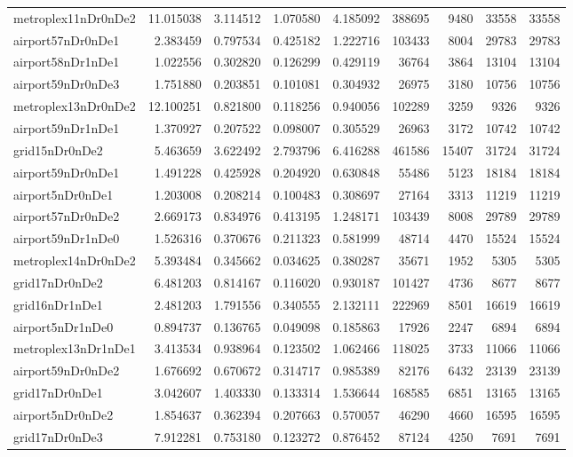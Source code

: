 \documentclass[../../../thesis.tex]{subfiles}
\begin{document}
\begin{longtable}{|l|r|r|r|r|r|r|r|r|}
metroplex11nDr0nDe2 & 11.015038 & 3.114512 & 1.070580 & 4.185092 & 388695 & 9480 & 33558 & 33558 \\
airport57nDr0nDe1 & 2.383459 & 0.797534 & 0.425182 & 1.222716 & 103433 & 8004 & 29783 & 29783 \\
airport58nDr1nDe1 & 1.022556 & 0.302820 & 0.126299 & 0.429119 & 36764 & 3864 & 13104 & 13104 \\
airport59nDr0nDe3 & 1.751880 & 0.203851 & 0.101081 & 0.304932 & 26975 & 3180 & 10756 & 10756 \\
metroplex13nDr0nDe2 & 12.100251 & 0.821800 & 0.118256 & 0.940056 & 102289 & 3259 & 9326 & 9326 \\
airport59nDr1nDe1 & 1.370927 & 0.207522 & 0.098007 & 0.305529 & 26963 & 3172 & 10742 & 10742 \\
grid15nDr0nDe2 & 5.463659 & 3.622492 & 2.793796 & 6.416288 & 461586 & 15407 & 31724 & 31724 \\
airport59nDr0nDe1 & 1.491228 & 0.425928 & 0.204920 & 0.630848 & 55486 & 5123 & 18184 & 18184 \\
airport5nDr0nDe1 & 1.203008 & 0.208214 & 0.100483 & 0.308697 & 27164 & 3313 & 11219 & 11219 \\
airport57nDr0nDe2 & 2.669173 & 0.834976 & 0.413195 & 1.248171 & 103439 & 8008 & 29789 & 29789 \\
airport59nDr1nDe0 & 1.526316 & 0.370676 & 0.211323 & 0.581999 & 48714 & 4470 & 15524 & 15524 \\
metroplex14nDr0nDe2 & 5.393484 & 0.345662 & 0.034625 & 0.380287 & 35671 & 1952 & 5305 & 5305 \\
grid17nDr0nDe2 & 6.481203 & 0.814167 & 0.116020 & 0.930187 & 101427 & 4736 & 8677 & 8677 \\
grid16nDr1nDe1 & 2.481203 & 1.791556 & 0.340555 & 2.132111 & 222969 & 8501 & 16619 & 16619 \\
airport5nDr1nDe0 & 0.894737 & 0.136765 & 0.049098 & 0.185863 & 17926 & 2247 & 6894 & 6894 \\
metroplex13nDr1nDe1 & 3.413534 & 0.938964 & 0.123502 & 1.062466 & 118025 & 3733 & 11066 & 11066 \\
airport59nDr0nDe2 & 1.676692 & 0.670672 & 0.314717 & 0.985389 & 82176 & 6432 & 23139 & 23139 \\
grid17nDr0nDe1 & 3.042607 & 1.403330 & 0.133314 & 1.536644 & 168585 & 6851 & 13165 & 13165 \\
airport5nDr0nDe2 & 1.854637 & 0.362394 & 0.207663 & 0.570057 & 46290 & 4660 & 16595 & 16595 \\
grid17nDr0nDe3 & 7.912281 & 0.753180 & 0.123272 & 0.876452 & 87124 & 4250 & 7691 & 7691 \\

\end{longtable}
\end{document}
